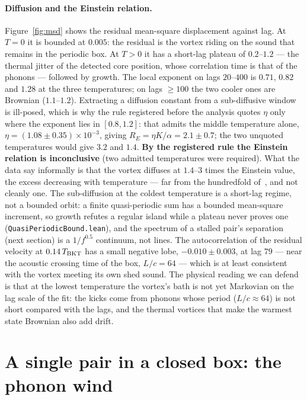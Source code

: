 \documentclass[11pt,a4paper]{article}
\newcommand{\lean}[1]{\texttt{\small #1}}
\begin{document}
\paragraph{Diffusion and the Einstein relation.} Figure~\ref{fig:msd} shows the residual mean-square displacement
against lag. At $T=0$ it is bounded at $0.005$: the residual is the vortex riding on the sound that remains in the
periodic box. At $T>0$ it has a short-lag plateau of $0.2$--$1.2$ --- the thermal jitter of the detected core position,
whose correlation time is that of the phonons --- followed by growth. The local exponent on lags $20$--$400$ is $0.71$,
$0.82$ and $1.28$ at the three temperatures; on lags $\ge100$ the two cooler ones are Brownian ($1.1$--$1.2$).
Extracting a diffusion constant from a sub-diffusive window is ill-posed, which is why the rule registered before the
analysis quotes $\eta$ only where the exponent lies in $[0.8,1.2]$: that admits the middle temperature alone,
$\eta=(1.08\pm0.35)\times10^{-3}$, giving $R_E=\eta K/\alpha=2.1\pm0.7$; the two unquoted temperatures would give
$3.2$ and $1.4$. \textbf{By the registered rule the Einstein relation is inconclusive} (two admitted temperatures were
required). What the data say informally is that the vortex diffuses at $1.4$--$3$ times the Einstein value, the
excess decreasing with temperature --- far from the hundredfold of~\cite{Neely2024}, and not cleanly one. The
sub-diffusion at the coldest temperature is a short-lag regime, not a bounded orbit: a finite quasi-periodic sum has
a bounded mean-square increment, so growth refutes a regular island while a plateau never proves one
(\lean{QuasiPeriodicBound.lean}), and the spectrum of a stalled pair's separation (next section) is a $1/f^{0.5}$
continuum, not lines. The autocorrelation of the residual velocity at $0.14\,T_{\rm BKT}$ has a small negative lobe,
$-0.010\pm0.003$, at lag $79$ --- near the acoustic crossing time of the box, $L/c=64$ --- which is at least
consistent with the vortex meeting its own shed sound. The physical reading we can defend is that at the lowest temperature the vortex's bath is
not yet Markovian on the lag scale of the fit: the kicks come from phonons whose period ($L/c\approx64$) is not short
compared with the lags, and the thermal vortices that make the warmest state Brownian also add drift.

\section{A single pair in a closed box: the phonon wind}\label{sec:wind}
\end{document}
